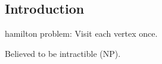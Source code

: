 
\subsection{Introduction}



hamilton problem: Visit each vertex once.


Believed to be intractible (NP).


